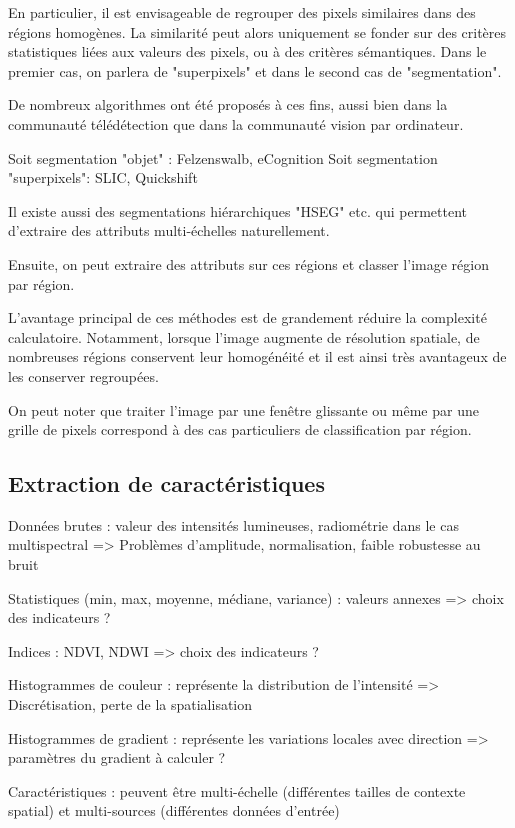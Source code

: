 En particulier, il est envisageable de regrouper des pixels similaires dans des régions homogènes. La similarité peut alors uniquement se fonder sur des critères statistiques liées aux valeurs des pixels, ou à des critères sémantiques. Dans le premier cas, on parlera de "superpixels" et dans le second cas de "segmentation".

De nombreux algorithmes ont été proposés à ces fins, aussi bien dans la communauté télédétection que dans la communauté vision par ordinateur.

Soit segmentation "objet" : Felzenswalb, eCognition
Soit segmentation "superpixels": SLIC, Quickshift

Il existe aussi des segmentations hiérarchiques "HSEG" etc. qui permettent d'extraire des attributs multi-échelles naturellement.

Ensuite, on peut extraire des attributs sur ces régions et classer l'image région par région.

L'avantage principal de ces méthodes est de grandement réduire la complexité calculatoire. Notamment, lorsque l'image augmente de résolution spatiale, de nombreuses régions conservent leur homogénéité et il est ainsi très avantageux de les conserver regroupées.

On peut noter que traiter l'image par une fenêtre glissante ou même par une grille de pixels correspond à des cas particuliers de classification par région.

\subsection{Extraction de caractéristiques}

Données brutes : valeur des intensités lumineuses, radiométrie dans le cas multispectral
  => Problèmes d'amplitude, normalisation, faible robustesse au bruit

Statistiques (min, max, moyenne, médiane, variance) : valeurs annexes
  => choix des indicateurs ?

Indices : NDVI, NDWI
  => choix des indicateurs ?

Histogrammes de couleur : représente la distribution de l'intensité
  => Discrétisation, perte de la spatialisation

Histogrammes de gradient : représente les variations locales avec direction
  => paramètres du gradient à calculer ?

Caractéristiques : peuvent être multi-échelle (différentes tailles de contexte spatial) et multi-sources (différentes données d'entrée)

